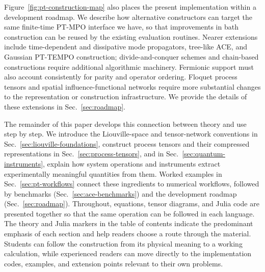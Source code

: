 Figure~\ref{fig:pt-construction-map} also places the present implementation within a development roadmap.
We describe how alternative constructors can target the same finite-time PT-MPO interface we have, so that improvements in bath construction can be reused by the existing evaluation routines.
Nearer extensions include time-dependent and dissipative mode propagators, tree-like ACE, and Gaussian PT-TEMPO construction; divide-and-conquer schemes and chain-based constructions require additional algorithmic machinery.
Fermionic support must also account consistently for parity and operator ordering.
Floquet process tensors and spatial influence-functional networks require more substantial changes to the representation or construction infrastructure.
We provide the details of these extensions in Sec.~\ref{sec:roadmap}.

The remainder of this paper develops this connection between theory and use step by step.
We introduce the Liouville-space and tensor-network conventions in Sec.~\ref{sec:liouville-foundations}, construct process tensors and their compressed representations in Sec.~\ref{sec:process-tensors}, and in Sec.~\ref{sec:quantum-instruments}, explain how system operations and instruments extract experimentally meaningful quantities from them.
Worked examples in Sec.~\ref{sec:pt-workflows} connect these ingredients to numerical workflows, followed by benchmarks (Sec.~\ref{sec:ace-benchmarks}) and the development roadmap (Sec.~\ref{sec:roadmap}).
Throughout, equations, tensor diagrams, and Julia code are presented together so that the same operation can be followed in each language.
The theory and Julia markers in the table of contents indicate the predominant emphasis of each section and help readers choose a route through the material.
Students can follow the construction from its physical meaning to a working calculation, while experienced readers can move directly to the implementation codes, examples, and extension points relevant to their own problems.
